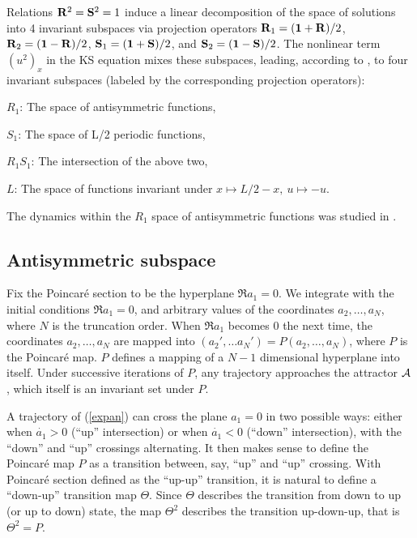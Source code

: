 Relations $\mathbf{R}^2=\mathbf{S}^2=1$
induce a linear decomposition of the space of solutions into 4 invariant
subspaces via projection operators
$\mathbf{R}_1=(\mathbf 1+\mathbf{R})/2$,
$\mathbf{R}_2=(\mathbf 1-\mathbf{R})/2$,
$\mathbf{S}_1=(\mathbf 1+\mathbf{S})/2$, and
$\mathbf{S}_2=(\mathbf 1-\mathbf{S})/2$. The nonlinear term $(u^2)_x$ in the KS equation
mixes these subspaces, leading,
according to , to four invariant subspaces
(labeled by the corresponding projection operators):
\begin{romannum} %

 \item[$R_1$:] The space of antisymmetric functions,
 \item[$S_1$:] The space of L/2 periodic functions,
 \item[$R_1 S_1$:] The intersection of the above two,
 \item[$L$:] The space of functions invariant under $x\mapsto L/2-x,\ u\mapsto -u$.
 
\end{romannum} %
The dynamics within the $R_1$ space of antisymmetric functions
was studied in .


\subsection{Antisymmetric subspace} 
\label{s:AntisymmSubsp}

Fix the  Poincar\'e section to be the hyperplane
$\Re a_1=0$. We integrate  with the initial
 conditions
$\Re a_1=0$, and arbitrary values of the coordinates  $a_2, \ldots, a_N$, where
$N$ is the truncation order.  When $\Re a_1$ becomes
$0$ the next time,  the coordinates  $a_2, \ldots, a_N$ are mapped
into $(a_2', \ldots a_N')=P(a_2, \ldots, a_N)$, where $P$ is the  Poincar\'e
map. $P$ defines a mapping of a $N-1$ dimensional hyperplane into itself.
Under successive iterations of  $P$, any trajectory
approaches the attractor ${\cal A}$, which itself is an invariant
set under $P$.

A trajectory of
 (\ref{expan}) can cross the plane $a_1=0$ in two possible ways:
 either when
$\dot{a_1}>0$ (``up'' intersection)
or when  $\dot{a_1}<0$ (``down'' intersection),
 with the ``down'' and ``up'' crossings
alternating.
It then makes sense to define the  Poincar\'e map $P$ as a transition between,
say, ``up'' and ``up'' crossing.
With  Poincar\'e section defined as the ``up-up'' transition,
it is natural to define a ``down-up'' transition map $\Theta$. Since
$\Theta$ describes the transition from down to up (or up to down) state,
the map $\Theta^2$ describes the transition  up-down-up, that is
$\Theta^2=P$.

